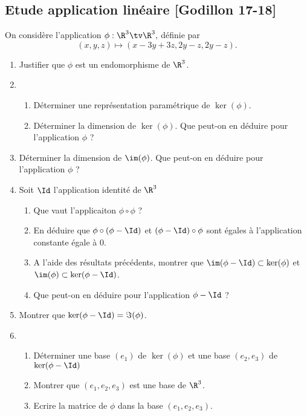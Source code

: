 \subsection{Etude application linéaire [Godillon 17-18]}

\begin{exercice}%
On considère l'application $\phi : \R^3 \tv \R^3, $ définie par 
$$(x,y,z) \mapsto (x-3y +3z, 2y-z, 2y-z).$$
\begin{enumerate}
\item Justifier que $\phi$ est un endomorphisme de $\R^3$.
\item
\begin{enumerate}
\item  Déterminer une représentation paramétrique de $\ker(\phi)$. 
\item Déterminer la dimension de $\ker (\phi)$. Que peut-on en déduire pour l'application $\phi$ ?

\end{enumerate}
\item Déterminer la dimension de $\im(\phi)$.  Que peut-on en déduire pour l'application $\phi$ ?
\item Soit $\Id$ l'application identité de $\R^3$
\begin{enumerate}
\item Que vaut l'applicaiton $\phi\circ \phi$ ?
\item En déduire que $\phi\circ (\phi-\Id)$ et $(\phi-\Id) \circ \phi$ sont égales à l'application constante égale à $0$. 
\item A l'aide des résultats précédents, montrer que $\im( \phi - \Id) \subset \ker(\phi)$ et 
$\im( \phi) \subset \ker(\phi- \Id)$.
\item Que peut-on en déduire pour l'application $\phi- \Id$ ? 
\end{enumerate}
\item Montrer que $\ker(\phi-\Id) = \Im(\phi)$.
\item \begin{enumerate}
\item Déterminer une base $(e_1)$  de $\ker(\phi)$ et une base $(e_2,e_3)$ de $\ker(\phi-\Id)$
\item Montrer que $(e_1, e_2, e_3) $ est une base de $\R^3$.
\item Ecrire la matrice de $\phi$ dans la base $(e_1, e_2, e_3) $.
\end{enumerate}
\end{enumerate}
\end{exercice}

